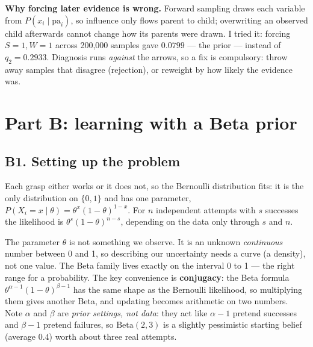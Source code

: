 \documentclass[12pt,a4paper]{article}
\begin{document}
\textbf{Why forcing later evidence is wrong.} Forward sampling draws each variable from
$P(x_i\mid\mathrm{pa}_i)$, so influence only flows parent to child; overwriting an observed child afterwards
cannot change how its parents were drawn. I tried it: forcing $S{=}1,W{=}1$ across 200{,}000 samples gave
$0.0799$ --- the prior --- instead of $q_2=0.2933$. Diagnosis runs \emph{against} the arrows, so a fix is
compulsory: throw away samples that disagree (rejection), or reweight by how likely the evidence was.

\section{Part B: learning with a Beta prior}

\subsection{B1. Setting up the problem}

Each grasp either works or it does not, so the Bernoulli distribution fits: it is the only distribution on
$\{0,1\}$ and has one parameter, $P(X_i{=}x\mid\theta)=\theta^x(1-\theta)^{1-x}$. For $n$ independent attempts
with $s$ successes the likelihood is $\theta^s(1-\theta)^{n-s}$, depending on the data only through $s$ and $n$.

The parameter $\theta$ is not something we observe. It is an unknown \emph{continuous} number between
0 and 1, so describing our uncertainty needs a curve (a density), not one value. The Beta family lives
exactly on the interval 0 to 1 --- the right range for a probability. The key convenience is
\textbf{conjugacy}: the Beta formula $\theta^{\alpha-1}(1-\theta)^{\beta-1}$ has the same shape as the
Bernoulli likelihood, so multiplying them gives another Beta, and updating becomes arithmetic on two
numbers. Note $\alpha$ and $\beta$ are \emph{prior settings, not data}: they act like $\alpha{-}1$
pretend successes and $\beta{-}1$ pretend failures, so $\mathrm{Beta}(2,3)$ is a slightly pessimistic
starting belief (average $0.4$) worth about three real attempts.
\end{document}
